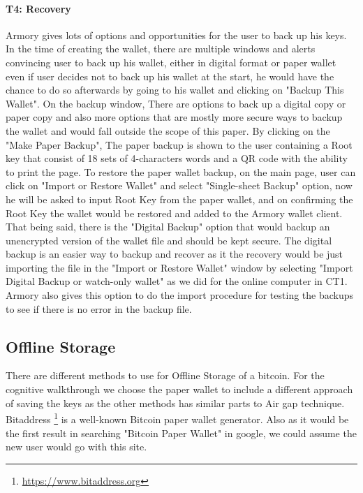 \paragraph{T4: Recovery}

Armory gives lots of options and opportunities for the user to back up his keys. In the time of creating the wallet, there are multiple windows and alerts convincing user to back up his wallet, either in digital format or paper wallet even if user decides not to back up his wallet at the start, he would have the chance to do so afterwards by going to his wallet and clicking on "Backup This Wallet". On the backup window, There are options to back up a digital copy or paper copy and also more options that are mostly more secure ways to backup the wallet and would fall outside the scope of this paper. By clicking on the "Make Paper Backup", The paper backup is shown to the user containing a Root key that consist of 18 sets of 4-characters words and a QR code with the ability to print the page. To restore the paper wallet backup, on the main page, user can click on "Import or Restore Wallet" and select "Single-sheet Backup" option, now he will be asked to input Root Key from the paper wallet, and on confirming the Root Key the wallet would be restored and added to the Armory wallet client. That being said, there is the "Digital Backup" option that would backup an unencrypted version of the wallet file and should be kept secure. The digital backup is an easier way to backup and recover as it the recovery would be just importing the file in the "Import or Restore Wallet" window by selecting "Import Digital Backup or watch-only wallet" as we did for the online computer in CT1. Armory also gives this option to do the import procedure for testing the backups to see if there is no error in the backup file.



\subsection{Offline Storage}

There are different methods to use for Offline Storage of a bitcoin. For the cognitive walkthrough we choose the paper wallet to include a different approach of saving the keys as the other methods has similar parts to Air gap technique. Bitaddress \footnote{\url{https://www.bitaddress.org}} is a well-known Bitcoin paper wallet generator. Also as it would be the first result in searching "Bitcoin Paper Wallet" in google, we could assume the new user would go with this site.\\

